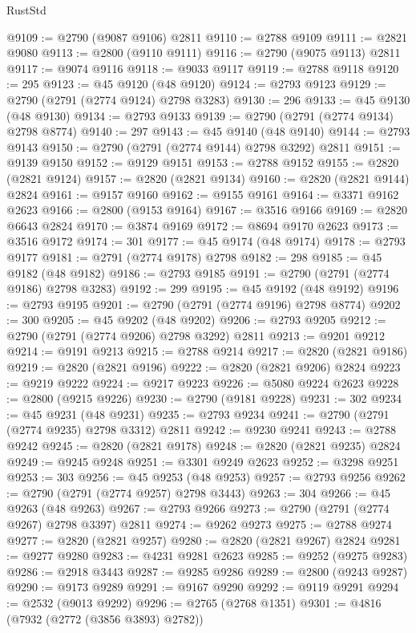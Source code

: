 \begin{lexlean}{RustStd}
\begin{coremodule}
@9109 := @2790 (@9087 @9106) @2811
@9110 := @2788 @9109
@9111 := @2821 @9080
@9113 := @2800 (@9110 @9111)
@9116 := @2790 (@9075 @9113) @2811
@9117 := @9074 @9116
@9118 := @9033 @9117
@9119 := @2788 @9118
@9120 := 295
@9123 := @45 @9120 (@48 @9120)
@9124 := @2793 @9123
@9129 := @2790 (@2791 (@2774 @9124) @2798 @3283)
@9130 := 296
@9133 := @45 @9130 (@48 @9130)
@9134 := @2793 @9133
@9139 := @2790 (@2791 (@2774 @9134) @2798 @8774)
@9140 := 297
@9143 := @45 @9140 (@48 @9140)
@9144 := @2793 @9143
@9150 := @2790 (@2791 (@2774 @9144) @2798 @3292) @2811
@9151 := @9139 @9150
@9152 := @9129 @9151
@9153 := @2788 @9152
@9155 := @2820 (@2821 @9124)
@9157 := @2820 (@2821 @9134)
@9160 := @2820 (@2821 @9144) @2824
@9161 := @9157 @9160
@9162 := @9155 @9161
@9164 := @3371 @9162 @2623
@9166 := @2800 (@9153 @9164)
@9167 := @3516 @9166
@9169 := @2820 @6643 @2824
@9170 := @3874 @9169
@9172 := @8694 @9170 @2623
@9173 := @3516 @9172
@9174 := 301
@9177 := @45 @9174 (@48 @9174)
@9178 := @2793 @9177
@9181 := @2791 (@2774 @9178) @2798
@9182 := 298
@9185 := @45 @9182 (@48 @9182)
@9186 := @2793 @9185
@9191 := @2790 (@2791 (@2774 @9186) @2798 @3283)
@9192 := 299
@9195 := @45 @9192 (@48 @9192)
@9196 := @2793 @9195
@9201 := @2790 (@2791 (@2774 @9196) @2798 @8774)
@9202 := 300
@9205 := @45 @9202 (@48 @9202)
@9206 := @2793 @9205
@9212 := @2790 (@2791 (@2774 @9206) @2798 @3292) @2811
@9213 := @9201 @9212
@9214 := @9191 @9213
@9215 := @2788 @9214
@9217 := @2820 (@2821 @9186)
@9219 := @2820 (@2821 @9196)
@9222 := @2820 (@2821 @9206) @2824
@9223 := @9219 @9222
@9224 := @9217 @9223
@9226 := @5080 @9224 @2623
@9228 := @2800 (@9215 @9226)
@9230 := @2790 (@9181 @9228)
@9231 := 302
@9234 := @45 @9231 (@48 @9231)
@9235 := @2793 @9234
@9241 := @2790 (@2791 (@2774 @9235) @2798 @3312) @2811
@9242 := @9230 @9241
@9243 := @2788 @9242
@9245 := @2820 (@2821 @9178)
@9248 := @2820 (@2821 @9235) @2824
@9249 := @9245 @9248
@9251 := @3301 @9249 @2623
@9252 := @3298 @9251
@9253 := 303
@9256 := @45 @9253 (@48 @9253)
@9257 := @2793 @9256
@9262 := @2790 (@2791 (@2774 @9257) @2798 @3443)
@9263 := 304
@9266 := @45 @9263 (@48 @9263)
@9267 := @2793 @9266
@9273 := @2790 (@2791 (@2774 @9267) @2798 @3397) @2811
@9274 := @9262 @9273
@9275 := @2788 @9274
@9277 := @2820 (@2821 @9257)
@9280 := @2820 (@2821 @9267) @2824
@9281 := @9277 @9280
@9283 := @4231 @9281 @2623
@9285 := @9252 (@9275 @9283)
@9286 := @2918 @3443
@9287 := @9285 @9286
@9289 := @2800 (@9243 @9287)
@9290 := @9173 @9289
@9291 := @9167 @9290
@9292 := @9119 @9291
@9294 := @2532 (@9013 @9292)
@9296 := @2765 (@2768 @1351)
@9301 := @4816 (@7932 (@2772 (@3856 @3893) @2782))

\end{coremodule}
\end{lexlean}
